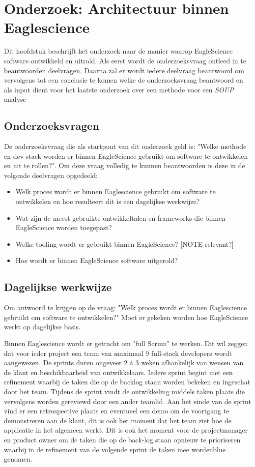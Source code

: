 \chapter{Onderzoek: Architectuur binnen Eaglescience}\label{ch:onderzoek:-architectuur-binnen-eaglescience}

Dit hoofdstuk beschrijft het onderzoek naar de manier waarop EagleScience software ontwikkeld en uitrold. Als eerst wordt de onderzoeksvraag ontleed in te beantwoorden deelvragen. Daarna zal er wordt iedere deelvraag beantwoord om vervolgens tot een conclusie te komen welke de onderzoeksvraag beantwoord en als input dient voor het laatste onderzoek over een methode voor een \textit{SOUP} analyse


\section{Onderzoeksvragen}\label{sec:ESOnderzoeksVraag}
De onderzoeksvraag die als startpunt van dit onderzoek geld is: "Welke methode en dev-stack worden er binnen EagleScience gebruikt om software te ontwikkelen en uit te rollen?". Om deze vraag volledig te kunnen beantwoorden is deze in de volgende deelvragen opgedeeld:
\begin{itemize}
    \item Welk proces wordt er binnen Eaglescience gebruikt om software te ontwikkelen en hoe resulteert dit is een dagelijkse werkwijze?
    \item Wat zijn de meest gebruikte ontwikkeltalen en frameworks die binnen EagleScience worden toegepast?
    \item Welke tooling wordt er gebruikt binnen EagleScience? [NOTE relevant?]
    \item Hoe wordt er binnen EagleScience software uitgerold?
\end{itemize}


\section{Dagelijkse werkwijze}\label{sec:dagelijkse-werkwijze}
Om antwoord te krijgen op de vraag: "Welk proces wordt er binnen Eaglescience gebruikt om software te ontwikkelen?" Moet er gekeken worden hoe EagleScience werkt op dagelijkse basis.

Binnen Eaglescience wordt er getracht om "full Scrum" te werken. Dit wil zeggen dat voor ieder project een team van maximaal 9 full-stack developers wordt aangewezen. De sprints duren ongeveer 2 á 3 weken afhankelijk van wensen van de klant en beschikbaarheid van ontwikkelaars. Iedere sprint begint met een refinement waarbij de taken die op de backlog staan worden bekeken en ingeschat door het team. Tijdens de sprint vindt de ontwikkeling middels taken plaats die vervolgens worden gereviewd door een ander teamlid. Aan het einde van de sprint vind er een retrospective plaats en eventueel een demo om de voortgang te demonstreren aan de klant, dit is ook het moment dat het team ziet hoe de applicatie in het algemeen werkt. Dit is ook het moment voor de projectmanager en product owner om de taken die op de back-log staan opnieuw te prioriseren waarbij in de refinement van de volgende sprint de taken mee wordenblue genomen.

